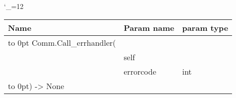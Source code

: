 \begingroup \catcode`\_=12 \tt
\begin{tabular}{lll}
\toprule
\textrm{Name}&\textrm{Param name}&\textrm{param type}\\
\midrule
\hbox to 0pt {Comm.Call_errhandler(\hss}\\
& self\\
& errorcode & int\\
\hbox to 0pt{) -> None\hss}\\
\bottomrule
\end{tabular}
\endgroup
